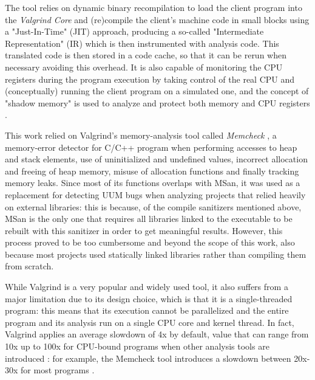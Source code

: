 The tool relies on dynamic binary recompilation to load the client program into the \textit{Valgrind Core} and (re)compile the client's machine code in small blocks using a "Just-In-Time" (JIT) approach, producing a so-called "Intermediate Representation" (IR) which is then instrumented with analysis code. This translated code is then stored in a code cache, so that it can be rerun when necessary avoiding this overhead. It is also capable of monitoring the CPU registers during the program execution by taking control of the real CPU and (conceptually) running the client program on a simulated one, and the concept of "shadow memory" is used to analyze and protect both memory and CPU registers \cite{Valgrind_1} \cite{Valgrind_2}.

This work relied on Valgrind's memory-analysis tool called \textit{Memcheck} \cite{memcheck_docs}\cite{memcheck_paper}, a memory-error detector for C/C++ program when performing accesses to heap and stack elements, use of uninitialized and undefined values, incorrect allocation and freeing of heap memory, misuse of allocation functions and finally tracking memory leaks. Since most of its functions overlaps with MSan, it was used as a replacement for detecting UUM bugs when analyzing projects that relied heavily on external libraries: this is because, of the compile sanitizers mentioned above, MSan is the only one that requires all libraries linked to the executable to be rebuilt with this sanitizer in order to get meaningful results. However, this process proved to be too cumbersome and beyond the scope of this work, also because most projects used statically linked libraries rather than compiling them from scratch.

While Valgrind is a very popular and widely used tool, it also suffers from a major limitation due to its design choice, which is that it is a single-threaded program: this means that its execution cannot be parallelized and the entire program and its analysis run on a single CPU core and kernel thread. In fact, Valgrind applies an average slowdown of 4x by default, value that can range from 10x up to 100x for CPU-bound programs when other analysis tools are introduced \cite{Valgrind_1}: for example, the Memcheck tool introduces a slowdown between 20x-30x for most programs \cite{memcheck_docs}.





\newpage
